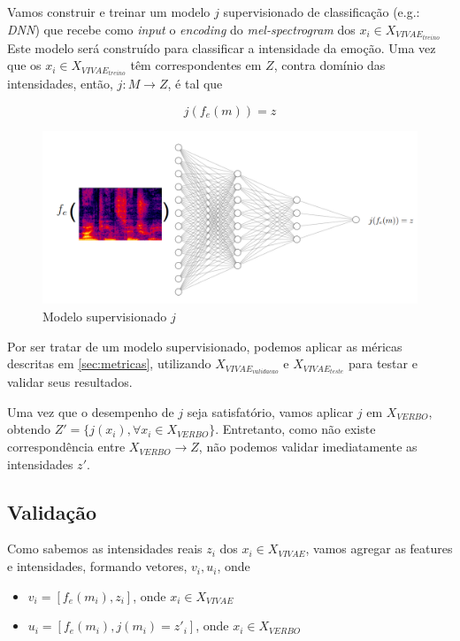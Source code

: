 Vamos construir e treinar um modelo $j$ supervisionado de classificação (e.g.: \textit{DNN}) que recebe como \textit{input} o \textit{encoding} do \textit{mel-spectrogram} dos $x_i \in X_{VIVAE_{treino}}$ Este modelo será construído para classificar a intensidade da emoção. Uma vez que os $x_i \in X_{VIVAE_{treino}}$ têm correspondentes em $Z$, contra domínio das intensidades, então, $j: M \rightarrow Z$, é tal que

\begin{equation}
    j(f_e(m)) = z
\end{equation}

\begin{figure}[!h]
\centering
\includegraphics[width=1.0\textwidth]{imagens/p-supervisionado.png}
\caption{\label{fig:jsupervisionado}Modelo supervisionado $j$}
\end{figure}

Por ser tratar de um modelo supervisionado, podemos aplicar as méricas descritas em \ref{sec:metricas}, utilizando $X_{VIVAE_{validacao}}$ e $X_{VIVAE_{teste}}$ para testar e validar seus resultados.

Uma vez que o desempenho de $j$ seja satisfatório, vamos aplicar $j$ em $X_{VERBO}$, obtendo $Z' = \{j(x_i), \forall x_i \in X_{VERBO}\}$. Entretanto, como não existe correspondência entre $X_{VERBO} \rightarrow Z$, não podemos validar imediatamente as intensidades $z'$.

\subsection{Validação}

Como sabemos as intensidades reais $z_i$ dos $x_i \in X_{VIVAE}$, vamos agregar as features e intensidades, formando vetores, $v_i, u_i$, onde

\begin{itemize}
    \item $v_i = [f_e(m_i), z_i]$, onde $x_i \in X_{VIVAE}$
    \item $u_i = [f_e(m_i), j(m_i) = z'_i]$, onde $x_i \in X_{VERBO}$
\end{itemize}

